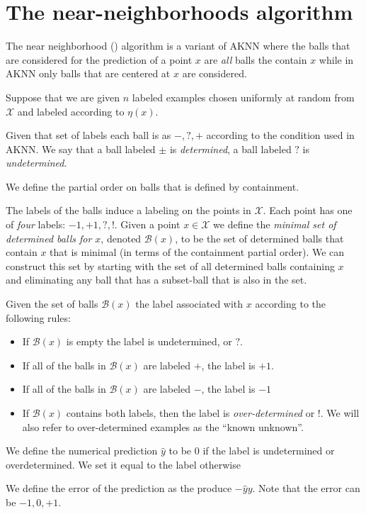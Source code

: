 \documentclass{article}
\def\X{{\mathcal X}}
\def\B{{\mathcal B}}
\begin{document}
\section{The near-neighborhoods algorithm}
The near neighborhood (\NNB) algorithm is a variant of AKNN where the balls
that are considered for the prediction of a point $x$ are {\em all} balls
the contain $x$ while in AKNN only balls that are centered at $x$ are
considered.

Suppose that we are given $n$ labeled examples chosen uniformly at
random from $\X$ and labeled according to $\eta(x)$.

Given that set of labels each ball is as $-,?,+$ according to the
condition used in AKNN. We say that a ball labeled $\pm$ is {\em
  determined}, a ball labeled $?$ is {\em undetermined}.

We define the partial order on balls that is defined by containment.

The labels of the balls induce a labeling on the points in $\X$. Each
point has one of {\em four} labels: $-1,+1,?,!$. Given a point $x \in
\X$ we define the {\em minimal set of determined balls for $x$},
denoted $\B(x)$, to be the set of determined balls that contain $x$
that is minimal (in terms of the containment partial order). We can
construct this set by starting with the set of all determined balls containing
$x$ and eliminating any ball that has a subset-ball that is also in
the set.

Given the set of balls $\B(x)$ the label associated with $x$
according to the following rules:
\begin{itemize}
\item If $\B(x)$ is empty the label is undetermined, or $?$.
\item If all of the balls in $\B(x)$ are labeled $+$, the label is $+1$.
\item If all of the balls in $\B(x)$ are labeled $-$, the label is $-1$
\item If $\B(x)$ contains both labels, then the label is {\em
    over-determined} or $!$. We will also refer to over-determined
  examples as the ``known unknown''.
\end{itemize}

We define the numerical prediction $\hat{y}$ to be $0$  if the label
is undetermined or overdetermined. We set it equal to the label otherwise

We define the error of the prediction as the produce
$-\hat{y}{y}$. Note that the error can be $-1,0,+1$. 
\end{document}
